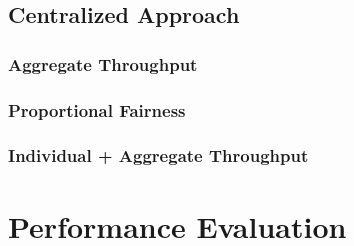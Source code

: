 \documentclass{article}
\begin{document}
	\subsection{Centralized Approach}
	\label{section:centralized}
	
		\subsubsection{Aggregate Throughput}
		\label{section:aggregate_throughput}
		
		\subsubsection{Proportional Fairness}
		\label{section:prop_fairness}
		
		\subsubsection{Individual + Aggregate Throughput}
		\label{section:mix}

\section{Performance Evaluation}
\label{section:performance_evaluation}

\end{document}
